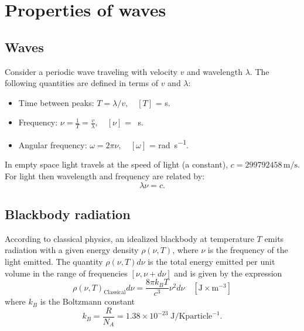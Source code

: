 \documentclass[../Main/chem331-notes.tex]{subfiles}
\begin{document}
\section{Properties of waves}
\subsection{Waves}
Consider a periodic wave traveling with velocity $v$ and wavelength $\lambda$.
 The following quantities are defined in terms of $v$ and $\lambda$:
\begin{itemize}
\item Time between peaks: $T = \lambda / v, \quad [T]$ = \si{\second}.
\item Frequency: $\nu = \frac{1}{T}=\frac{v}{\lambda},  \quad [\nu]$ = \si{\per\second}.
\item Angular frequency: $\omega = 2\pi \nu,  \quad [\omega]$ = \si{\radian\per\second}.
\end{itemize}

In empty space light travels at the speed of light (a constant), $c = 299792458 \, \si{\meter\per\second}$.
For light then wavelength and frequency are related by:
\begin{equation}
\lambda \nu = c.
\end{equation}

\subsection{Blackbody radiation}
According to classical physics, an idealized blackbody at temperature $T$ emits radiation with a given energy density
$\rho(\nu,T)$, where $\nu$ is the frequency of the light emitted.
The quantity $\rho(\nu,T) d\nu$ is the total energy emitted per unit volume in the range of frequencies $[\nu,\nu + d\nu]$ and is given by the expression
\begin{equation}
\rho(\nu,T)_\mathrm{Classical} d\nu = \frac{8 \pi k_B T}{c^3} \nu^2 d\nu \quad [\si{\joule\times\meter^{-3}}]
\end{equation}
where $k_B$ is the Boltzmann constant
\begin{equation}
k_B = \frac{R}{N_A} = 1.38 \times 10^{-23}\;\si{\joule\per\kelvin} \text{particle}^{-1}.
\end{equation}
\end{document}
